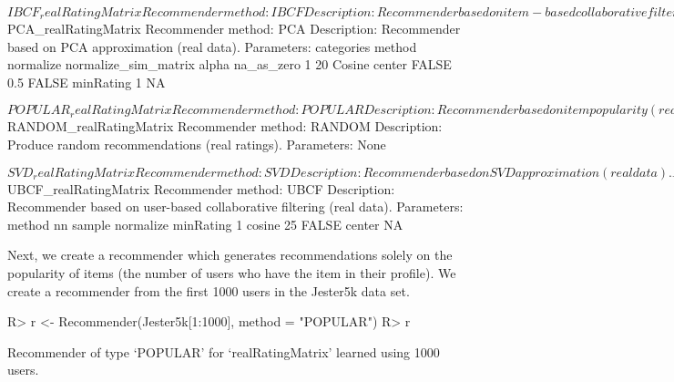 \documentclass[nojss]{jss}
\begin{document}
\begin{Schunk}
\begin{Soutput}
$IBCF_realRatingMatrix
Recommender method: IBCF
Description: Recommender based on item-based collaborative filtering (real data).
Parameters:
   k method normalize normalize_sim_matrix alpha na_as_zero minRating
1 30 Cosine    center                FALSE   0.5      FALSE        NA

$PCA_realRatingMatrix
Recommender method: PCA
Description: Recommender based on PCA approximation (real data).
Parameters:
  categories method normalize normalize_sim_matrix alpha na_as_zero
1         20 Cosine    center                FALSE   0.5      FALSE
  minRating
1        NA

$POPULAR_realRatingMatrix
Recommender method: POPULAR
Description: Recommender based on item popularity (real data).
Parameters: None

$RANDOM_realRatingMatrix
Recommender method: RANDOM
Description: Produce random recommendations (real ratings).
Parameters: None

$SVD_realRatingMatrix
Recommender method: SVD
Description: Recommender based on SVD approximation (real data).
Parameters:
  categories method normalize normalize_sim_matrix alpha treat_na
1         50 Cosine    center                FALSE   0.5   median
  minRating
1        NA

$UBCF_realRatingMatrix
Recommender method: UBCF
Description: Recommender based on user-based collaborative filtering (real data).
Parameters:
  method nn sample normalize minRating
1 cosine 25  FALSE    center        NA
\end{Soutput}
\end{Schunk}

Next, we create a recommender which generates recommendations
solely on the popularity of items (the number of users who have the item in
their profile). We create a recommender
from the first 1000 users in the Jester5k data set.

\begin{Schunk}
\begin{Sinput}
R> r <- Recommender(Jester5k[1:1000], method = "POPULAR")
R> r
\end{Sinput}
\begin{Soutput}
Recommender of type ‘POPULAR’ for ‘realRatingMatrix’
learned using 1000 users.
\end{Soutput}
\end{Schunk}
\end{document}

